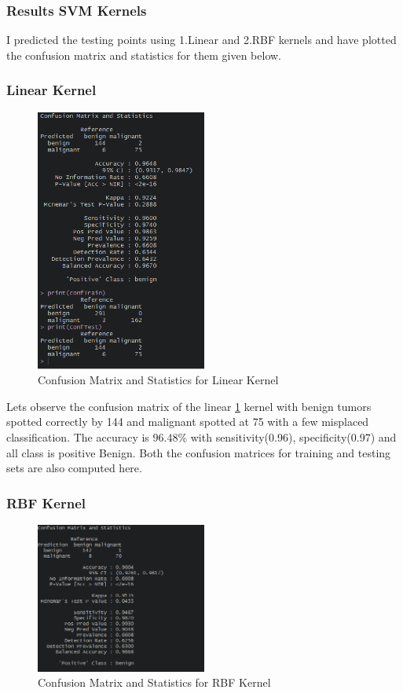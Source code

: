 \documentclass[conference]{IEEEtran}
\begin{document}
\subsubsection{Results SVM Kernels}
I predicted the testing points using 1.Linear and 2.RBF  kernels and have plotted the confusion matrix and statistics for them given below.
\subsubsection{Linear Kernel}

\begin{figure}[h]
\centering
\includegraphics[width=0.5\textwidth]{figs/after_tuning_linear.png}
\caption{Confusion Matrix and Statistics for Linear Kernel}
\label{fig:LIN_ker} 
\end{figure}

Lets observe the confusion matrix of the linear \ref{fig:LIN_ker} kernel with benign tumors spotted correctly by 144 and malignant spotted at 75 with a few  misplaced classification. The accuracy is 96.48\% with sensitivity(0.96), specificity(0.97) and all class is positive Benign. Both the confusion matrices for training and testing sets are also computed here.
\subsubsection{RBF Kernel}

\begin{figure}[ht!]
\centering
\includegraphics[width=0.5\textwidth]{figs/ConfMatRBF.png}
\caption{Confusion Matrix and Statistics for RBF Kernel}
\label{fig:RBF_conf} 
\end{figure}
\end{document}
